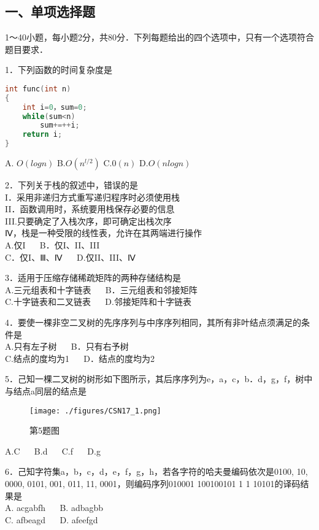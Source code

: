 

\subsection{一、单项选择题}
1～40小题，每小题2分，共80分．下列每题给出的四个选项中，只有一个选项符合题目要求．

1．下列函数的时间复杂度是 \\
\begin{lstlisting}[language=cpp]
int func(int n)
{
    int i=0，sum=0;
    while(sum<n)
        sum+=++i;
    return i;
}
\end{lstlisting}
A. $O(log n)$  B.$O(n^{l/2})$    C.$0(n)$    D.$O(nlogn)$
    
2．下列关于栈的叙述中，错误的是 \\
I．采用非递归方式重写递归程序时必须使用栈 \\
II．函数调用时，系统要用栈保存必要的信息 \\
III.只要确定了入栈次序，即可确定出栈次序 \\
Ⅳ，栈是一种受限的线性表，允许在其两端进行操作 \\
A.仅I  $\quad$  B．仅I、II、III \\
C．仅I、Ⅲ、Ⅳ  $\quad$  D.仅II、III、Ⅳ

3．适用于压缩存储稀疏矩阵的两种存储结构是 \\
A.三元组表和十字链表 $\quad$ B．三元组表和邻接矩阵 \\
C.十字链表和二叉链表 $\quad$ D.邻接矩阵和十字链表

4．要使一棵非空二叉树的先序序列与中序序列相同，其所有非叶结点须满足的条件是 \\
A.只有左子树  $\quad$  B．只有右予树 \\
C.结点的度均为1 $\quad$ D．结点的度均为2

5．己知一棵二叉树的树形如下图所示，其后序序列为e，a，c，b．d，g，f，树中与结点a同层的结点是 \\
\begin{figure}[ht]
\centering
\texttt{[image: ./figures/CSN17\_1.png]}
\caption{第5题图} \label{CSN17_fig1}
\end{figure}
A.C $\quad$ B.d $\quad$ C.f $\quad$ D.g

6．己知字符集{a，b，c，d，e，f，g，h}，若各字符的哈夫曼编码依次是0100, 10, 0000, 0101, 001, 011, 11, 0001，则编码序列010001 100100101 1 1 10101的译码结果是 \\
A. acgabfh  $\quad$  B. adbagbb  \\
C. afbeagd  $\quad$  D. afeefgd

